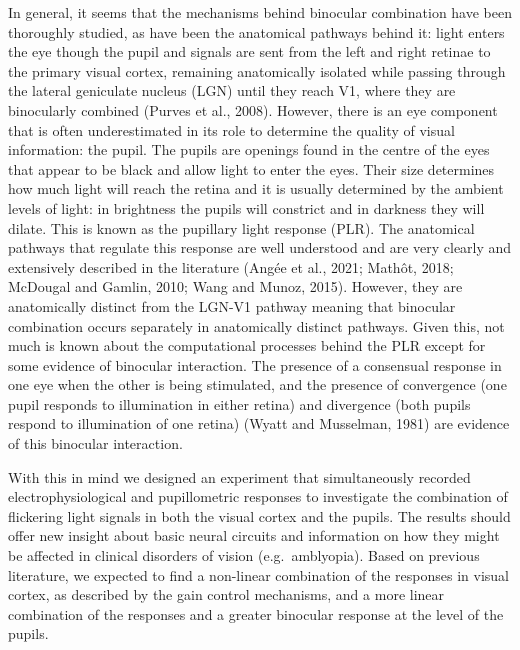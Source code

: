 \documentclass[
]{article}
\begin{document}
In general, it seems that the mechanisms behind binocular combination have been thoroughly studied, as have been the anatomical pathways behind it: light enters the eye though the pupil and signals are sent from the left and right retinae to the primary visual cortex, remaining anatomically isolated while passing through the lateral geniculate nucleus (LGN) until they reach V1, where they are binocularly combined (Purves et al., 2008). However, there is an eye component that is often underestimated in its role to determine the quality of visual information: the pupil. The pupils are openings found in the centre of the eyes that appear to be black and allow light to enter the eyes. Their size determines how much light will reach the retina and it is usually determined by the ambient levels of light: in brightness the pupils will constrict and in darkness they will dilate. This is known as the pupillary light response (PLR). The anatomical pathways that regulate this response are well understood and are very clearly and extensively described in the literature (Angée et al., 2021; Mathôt, 2018; McDougal and Gamlin, 2010; Wang and Munoz, 2015). However, they are anatomically distinct from the LGN-V1 pathway meaning that binocular combination occurs separately in anatomically distinct pathways. Given this, not much is known about the computational processes behind the PLR except for some evidence of binocular interaction. The presence of a consensual response in one eye when the other is being stimulated, and the presence of convergence (one pupil responds to illumination in either retina) and divergence (both pupils respond to illumination of one retina) (Wyatt and Musselman, 1981) are evidence of this binocular interaction.

With this in mind we designed an experiment that simultaneously recorded electrophysiological and pupillometric responses to investigate the combination of flickering light signals in both the visual cortex and the pupils. The results should offer new insight about basic neural circuits and information on how they might be affected in clinical disorders of vision (e.g.~amblyopia). Based on previous literature, we expected to find a non-linear combination of the responses in visual cortex, as described by the gain control mechanisms, and a more linear combination of the responses and a greater binocular response at the level of the pupils.
\end{document}
